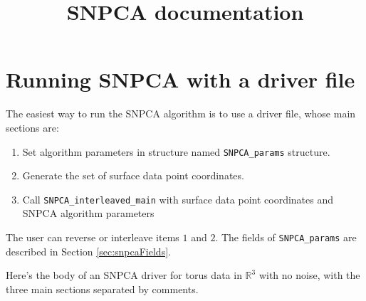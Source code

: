 \documentclass[11pt]{amsart}
\title{SNPCA documentation}
\begin{document}
\maketitle
\section{Running SNPCA with a driver file}
\label{sec:driverFile}

The easiest way to run the SNPCA algorithm is to use a driver file, whose main sections are:
\begin{enumerate}
\item
Set algorithm parameters in structure named \verb+SNPCA_params+ structure.
\item
Generate the set of surface data point coordinates.
\item
Call \verb+SNPCA_interleaved_main+ with surface data point coordinates and SNPCA algorithm parameters
\end{enumerate}
The user can reverse or interleave items $1$ and $2$.
The fields of \verb+SNPCA_params+ are described in Section \ref{sec:snpcaFields}.

Here's the body of an SNPCA driver for torus data in $\mathbb{R}^3$ with no noise, with the three main sections separated by comments.
\end{document}
